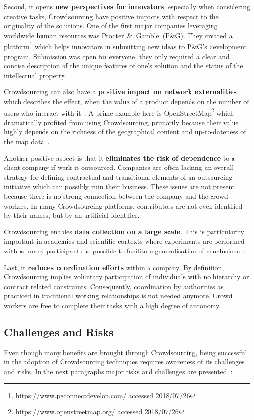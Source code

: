 Second, it opens \textbf{new perspectives for innovators}, especially when considering creative tasks, Crowdsourcing have positive impacts with respect to the originality of the solutions. One of the first major companies leveraging worldwide human resources was Procter~\&~Gamble~(P\&G). They created a platform\footnote{\url{https://www.pgconnectdevelop.com/} accessed 2018/07/26} which helps innovators in submitting new ideas to P\&G's development program. Submission was open for everyone, they only required a clear and concise description of the unique features of one's solution and the status of the intellectual property. 

Crowdsourcing can also have a \textbf{positive impact on network externalities} which describes the effect, when the value of a product depends on the number of users who interact with it~\cite{shapiro1998}. A prime example here is OpenStreetMap\footnote{\url{https://www.openstreetmap.org/} accessed 2018/07/26} which dramatically profited from using Crowdsourcing, primarily because their value highly depends on the richness of the geographical content and up-to-dateness of the map data~\cite{chilton2009}. 

Another positive aspect is that it \textbf{eliminates the risk of dependence} to a client company if work it outsourced. Companies are often lacking an overall strategy for defining contractual and transitional elements of an outsourcing initiative which can possibly ruin their business. These issues are not present because there is no strong connection between the company and the crowd workers. In many Crowdsourcing platforms, contributors are not even identified by their names, but by an artificial identifier. 

Crowdsourcing enables \textbf{data collection on a large scale}. This is particularity important in academics and scientific contexts where experiments are performed with as many participants as possible to facilitate generalisation of conclusions~\cite{gadiraju2017}. 

Last, it \textbf{reduces coordination efforts} within a company. By definition, Crowdsourcing implies voluntary participation of individuals with no hierarchy or contract related constraints. Consequently, coordination by authorities as practiced in traditional working relationships is not needed anymore. Crowd workers are free to complete their tasks with a high degree of autonomy. 

\subsection{Challenges and Risks}
Even though many benefits are brought through Crowdsourcing, being successful in the adoption of Crowdsourcing techniques requires awareness of its challenges and risks. In the next paragraphs major risks and challenges are presented~\cite{hossfeld2013}:

